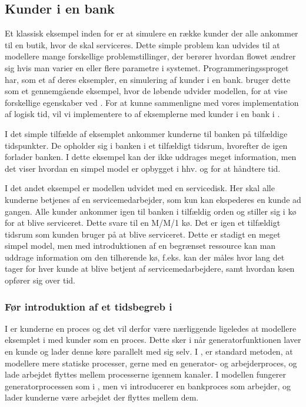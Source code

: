 

\subsection{Kunder i en bank}\label{bank-eksempel}
Et klassisk eksempel inden for \des er at simulere  en række kunder der alle 
ankommer til en butik, hvor de skal serviceres. Dette simple problem kan 
udvides til at modellere mange forskellige problemstillinger, der berører 
hvordan flowet ændrer sig hvis man varier en eller flere parametre
i systemet. Programmeringssproget \simpy{}har, som et af deres 
eksempler, en simulering af kunder i en bank. \simpy bruger dette som et 
gennemgående eksempel, hvor de løbende udvider modellen, for at vise 
forskellige egenskaber ved \simpy. For at kunne sammenligne \simpy  med vores 
implementation af logisk tid, vil vi implementere to af eksemplerne med kunder 
i en bank i \pycsp.

I det simple tilfælde af eksemplet ankommer kunderne til banken på 
tilfældige tidspunkter.  De opholder sig i banken i et tilfældigt 
tidsrum, hvorefter de igen forlader banken. I dette eksempel kan der ikke 
uddrages meget information, men det viser hvordan en simpel model er opbygget i 
hhv.  \simpy og \pycsp for at håndtere tid.

I det andet eksempel er modellen udvidet med en servicedisk. Her skal alle 
kunderne betjenes af en servicemedarbejder, som kun kan ekspederes en kunde ad 
gangen. Alle kunder ankommer igen til banken i tilfældig orden og stiller sig i 
kø for at blive serviceret. Dette  svare til en M/M/1 kø. Det er igen et tilfældigt tidsrum som kunden bruger på at blive 
serviceret.  Dette er stadigt en meget simpel model, men med introduktionen af 
en begrænset ressource kan man uddrage information om den tilhørende kø, f.eks. 
kan der måles hvor lang det tager for hver kunde at blive betjent af 
servicemedarbejdere, samt hvordan køen opfører sig over tid. 

\subsubsection{Før introduktion af et tidsbegreb i \pycsp}
I \simpy er kunderne en proces og det vil derfor være nærliggende ligeledes at 
modellere eksemplet i \pycsp med kunder som en proces. Dette sker i  \simpy når
generatorfunktionen laver en kunde og lader denne køre parallelt med sig selv.  
I \pycsp, er standard metoden, at 
modellere mere statiske processer, gerne med en generator- og 
arbejderproces, og lade arbejdet flyttes 
mellem processerne igennem kanaler. I \pycsp modellen fungerer 
generatorprocessen som i \simpy, men vi introducerer en bankproces 
som arbejder, og lader kunderne være arbejdet der flyttes mellem dem. 

